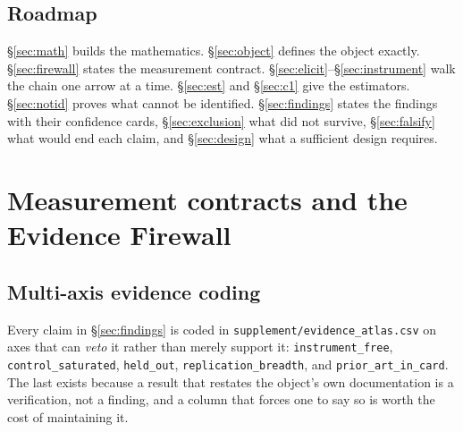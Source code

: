 \subsection{Roadmap}

§\ref{sec:math} builds the mathematics. §\ref{sec:object} defines the object
exactly. §\ref{sec:firewall} states the measurement contract.
§\ref{sec:elicit}--§\ref{sec:instrument} walk the chain one arrow at a time.
§\ref{sec:est} and §\ref{sec:c1} give the estimators. §\ref{sec:notid} proves
what cannot be identified. §\ref{sec:findings} states the findings with their
confidence cards, §\ref{sec:exclusion} what did not survive,
§\ref{sec:falsify} what would end each claim, and §\ref{sec:design} what a
sufficient design requires.







\section{Measurement contracts and the Evidence Firewall}


\subsection{Multi-axis evidence coding}

Every claim in §\ref{sec:findings} is coded in
\texttt{supplement/evidence\_atlas.csv} on axes that can \emph{veto} it rather
than merely support it: \texttt{instrument\_free}, \texttt{control\_saturated},
\texttt{held\_out}, \texttt{replication\_breadth}, and \texttt{prior\_art\_in\_card}.
The last exists because a result that restates the object's own documentation is
a verification, not a finding, and a column that forces one to say so is worth
the cost of maintaining it.







